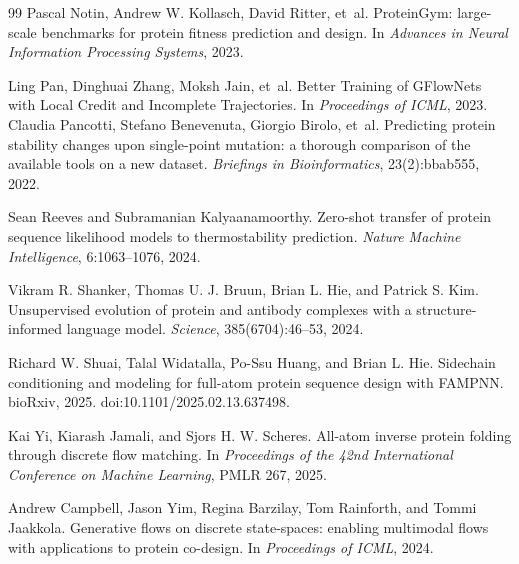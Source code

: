 \documentclass[11pt]{article}
\begin{document}
\begin{thebibliography}{99}
Pascal Notin, Andrew W. Kollasch, David Ritter, et~al.
\newblock ProteinGym: large-scale benchmarks for protein fitness prediction and design.
\newblock In \emph{Advances in Neural Information Processing Systems}, 2023.

Ling Pan, Dinghuai Zhang, Moksh Jain, et~al.
\newblock Better Training of GFlowNets with Local Credit and Incomplete Trajectories.
\newblock In \emph{Proceedings of ICML}, 2023.
Claudia Pancotti, Stefano Benevenuta, Giorgio Birolo, et~al.
\newblock Predicting protein stability changes upon single-point mutation: a thorough comparison of the available tools on a new dataset.
\newblock \emph{Briefings in Bioinformatics}, 23(2):bbab555, 2022.


Sean Reeves and Subramanian Kalyaanamoorthy.
\newblock Zero-shot transfer of protein sequence likelihood models to thermostability prediction.
\newblock \emph{Nature Machine Intelligence}, 6:1063--1076, 2024.

Vikram R. Shanker, Thomas U. J. Bruun, Brian L. Hie, and Patrick S. Kim.
\newblock Unsupervised evolution of protein and antibody complexes with a structure-informed language model.
\newblock \emph{Science}, 385(6704):46--53, 2024.

Richard W. Shuai, Talal Widatalla, Po-Ssu Huang, and Brian L. Hie.
\newblock Sidechain conditioning and modeling for full-atom protein sequence design with FAMPNN.
\newblock bioRxiv, 2025. doi:10.1101/2025.02.13.637498.


Kai Yi, Kiarash Jamali, and Sjors H. W. Scheres.
\newblock All-atom inverse protein folding through discrete flow matching.
\newblock In \emph{Proceedings of the 42nd International Conference on Machine Learning}, PMLR 267, 2025.

Andrew Campbell, Jason Yim, Regina Barzilay, Tom Rainforth, and Tommi Jaakkola.
\newblock Generative flows on discrete state-spaces: enabling multimodal flows with applications to protein co-design.
\newblock In \emph{Proceedings of ICML}, 2024.


\end{thebibliography}
\end{document}
